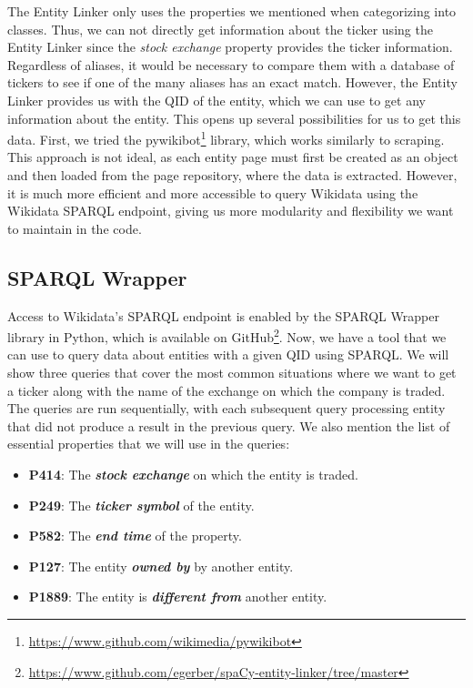 The Entity Linker only uses the properties we mentioned when categorizing into classes. Thus, we can not directly get information about the ticker using the Entity Linker since the \textit{stock exchange} property provides the ticker information. Regardless of aliases, it would be necessary to compare them with a database of tickers to see if one of the many aliases has an exact match. However, the Entity Linker provides us with the QID of the entity, which we can use to get any information about the entity. This opens up several possibilities for us to get this data. First, we tried the pywikibot\footnote{\href{https://www.github.com/wikimedia/pywikibot}{https://www.github.com/wikimedia/pywikibot}} library, which works similarly to scraping. This approach is not ideal, as each entity page must first be created as an object and then loaded from the page repository, where the data is extracted. However, it is much more efficient and more accessible to query Wikidata using the Wikidata SPARQL endpoint, giving us more modularity and flexibility we want to maintain in the code.

\subsection{SPARQL Wrapper}
\label{subsubsec:sparql-wrapper}
Access to Wikidata's SPARQL endpoint is enabled by the SPARQL Wrapper library in Python, which is available on GitHub\footnote{\href{https://www.github.com/egerber/spaCy-entity-linker/tree/master}{https://www.github.com/egerber/spaCy-entity-linker/tree/master}}. Now, we have a tool that we can use to query data about entities with a given QID using SPARQL. We will show three queries that cover the most common situations where we want to get a ticker along with the name of the exchange on which the company is traded. The queries are run sequentially, with each subsequent query processing entity that did not produce a result in the previous query. We also mention the list of essential properties that we will use in the queries:

\begin{itemize}
    \item \textbf{P414}: The \textbf{\textit{stock exchange}} on which the entity is traded.
    \item \textbf{P249}: The \textbf{\textit{ticker symbol}} of the entity.
    \item \textbf{P582}: The \textbf{\textit{end time}} of the property.
    \item \textbf{P127}: The entity \textbf{\textit{owned by}} by another entity.
    \item \textbf{P1889}: The entity is \textbf{\textit{different from}} another entity.
\end{itemize}

